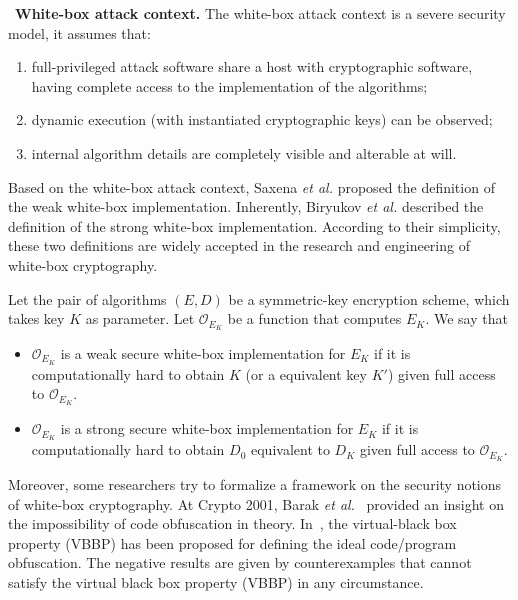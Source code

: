 \documentclass{SCIS2018}
\begin{document}
\cite{DBLP:conf/sacrypt/ChowEJO02}~\textbf{White-box attack context.} {The white-box attack context is a severe security model, it assumes that:}

\begin{enumerate}
\item full-privileged attack software share a host with cryptographic software, having complete access to the implementation of the algorithms;

\item dynamic execution (with instantiated cryptographic keys) can be observed;

\item internal algorithm details are completely visible and alterable at will.
\end{enumerate}

Based on the white-box attack context, Saxena \textit{et al.} \cite{DBLP:conf/isw/SaxenaWP09} proposed the definition of the weak white-box implementation. Inherently, Biryukov \textit{et al.} \cite{DBLP:conf/asiacrypt/BiryukovBK14} described the definition of the strong white-box implementation. According to their simplicity, these two definitions are widely accepted in the research and engineering of white-box cryptography.

\cite{DBLP:conf/isw/SaxenaWP09,DBLP:conf/asiacrypt/BiryukovBK14} Let the pair of algorithms $(E, D)$ be a symmetric-key encryption scheme, which takes key $K$ as parameter. Let $\mathcal{O}_{E_{K}}$ be a function that computes $E_{K}$. We say that
\begin{itemize}
\item $\mathcal{O}_{E_{K}}$ is a weak secure white-box implementation for $E_{K}$ if it is computationally hard to obtain $K$ (or a equivalent key $K'$) given full access to $\mathcal{O}_{E_{K}}$.

\item $\mathcal{O}_{E_{K}}$ is a strong secure white-box implementation for $E_{K}$ if it is computationally hard to obtain $D_{0}$ equivalent to $D_{K}$ given full access to $\mathcal{O}_{E_{K}}$.
\end{itemize}

Moreover, some researchers try to formalize a framework on the security notions of white-box cryptography. At Crypto 2001, Barak \textit{et al.}~\cite{DBLP:conf/crypto/BarakGIRSVY01,DBLP:journals/jacm/BarakGIRSVY12} provided an insight on the impossibility of code obfuscation in theory. In~\cite{DBLP:conf/crypto/BarakGIRSVY01}, the virtual-black box property (VBBP) has been proposed for defining the ideal code/program obfuscation. The negative results are given by counterexamples that cannot satisfy the virtual black box property (VBBP) in any circumstance.
\end{document}
